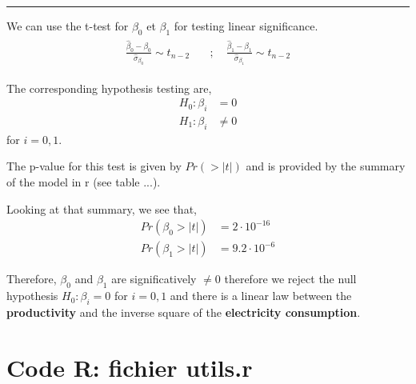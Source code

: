 \documentclass[10pt, a4paper, nofootinbib]{scrartcl}
\begin{document}
\begin{center}\rule{6cm}{0.4pt}\end{center}

We can use the t-test for $\beta_0$ et $\beta_1$ for testing linear significance.
\begin{align*}
  \begin{array}{rl}
    \frac{\hat{\beta}_0 - \beta_0}{\hat{\sigma}_{\beta_0}} \sim t_{n-2} \quad &; \quad 
    \frac{\hat{\beta}_1 - \beta_1}{\hat{\sigma}_{\beta_1}} \sim t_{n-2}
  \end{array}
\end{align*}

The corresponding hypothesis testing are, 
\begin{align*}
  H_0: \beta_i &= 0 \\
  H_1: \beta_i &\neq 0
\end{align*}
for $i = 0,1$. 

The p-value for this test is given by $Pr(> |t|)$ and is provided by the summary of the model in r (see table ...). 

Looking at that summary, we see that, 
\begin{align*}
  Pr(\beta_0 > |t|) &= 2 \cdot 10^{-16} \\
  Pr(\beta_1 > |t|) &= 9.2 \cdot 10^{-6}
\end{align*}

Therefore, $\beta_0$ and $\beta_1$ are significatively $\neq 0$ therefore we reject the null hypothesis $H_0: \beta_i = 0$ for $i = 0,1$ and there is a linear law between the \textbf{productivity} and the inverse square of the \textbf{electricity consumption}.

\newpage

\appendix
\appendixpage
\addappheadtotoc

\section{Code R: fichier utils.r}
\end{document}
